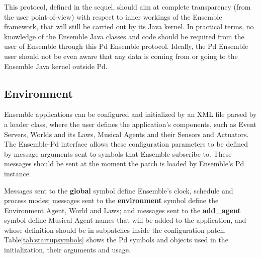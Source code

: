 \documentclass[a4paper, 11pt, twoside]{article}
\begin{document}
\begin{multicols}{2}
This protocol, defined in the sequel, should aim at complete transparency 
(from the user point-of-view) with respect to inner workings of the Ensemble 
framework, that will still be carried out by its Java kernel. In practical 
terms, no knowledge of the Ensemble Java classes and code should be required 
from the user of Ensemble through this Pd Ensemble protocol. Ideally, the Pd 
Ensemble user should not be even aware that any data is coming from or 
going to the Ensemble Java kernel outside Pd.

\subsection{Environment}

Ensemble applications can be configured and initialized by an XML file parsed 
by a loader class, where the user defines the application's components, such 
as Event Servers, Worlds and its Laws, Musical Agents and their Sensors and 
Actuators. The Ensemble-Pd interface allows these configuration parameters to 
be defined by message arguments sent to symbols that Ensemble subscribe to. 
These messages should be sent at the moment the patch is loaded by Ensemble's 
Pd instance.

Messages sent to the \textbf{global} symbol define Ensemble's clock, 
schedule and process modes; messages sent to the \textbf{environment} 
symbol define the Environment Agent, World and Laws; and messages sent to 
the \textbf{add\_agent} symbol define Musical Agent names that will be added 
to the application, and whose definition should be in subpatches inside the 
configuration patch. Table\ref{tab:startupsymbols} shows the Pd symbols and 
objects used in the initialization, their arguments and usage.

\end{multicols}
\end{document}
